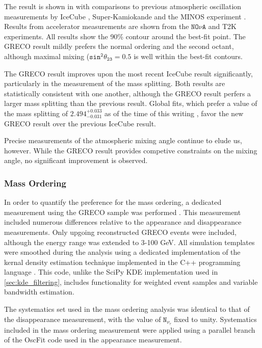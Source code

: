 The result is shown in  with comparisons to previous atmospheric oscillation measurements by IceCube , Super-Kamiokande  and the MINOS experiment .
Results from accelerator measurements are shown from the $\mathtt{NO\nu A}$  and T2K  experiments.
All results show the 90\% contour around the best-fit point.
The GRECO result mildly prefers the normal ordering and the second octant, although maximal mixing ($\mathtt{sin^2\theta_{23}=0.5}$ is well within the best-fit contours.

The GRECO result improves upon the most recent IceCube result significantly, particularly in the measurement of the mass splitting.
Both results are statistically consistent with one another, although the GRECO result perfers a larger mass splitting than the previous result.
Global fits, which prefer a value of the mass splitting of $\mathtt{2.494^{+0.033}_{-0.031}}$ as of the time of this writing , favor the new GRECO result over the previous IceCube result.

Precise measurements of the atmospheric mixing angle continue to elude us, however.
While the GRECO result provides competive constraints on the mixing angle, no significant improvement is observed.

\label{subsubsec:nmo_results}
\subsubsection{Mass Ordering}
In order to quantify the preference for the mass ordering, a dedicated measurement using the GRECO sample was performed .
This measurement included numerous differences relative to the appearance and disappearance measurements.
Only upgoing reconstructed GRECO events were included, although the energy range was extended to 3-100 GeV.
All simulation templates were smoothed during the analysis using a dedicated implementation of the kernal density estimation technique implemented in the C++ programming language .
This code, unlike the SciPy KDE implementation used in \ref{sec:kde_filtering}, includes functionality for weighted event samples and variable bandwidth estimation.

The systematics set used in the mass ordering analysis was identical to that of the disappearance measurement, with the value of $\mathtt{N_{\nu_\tau}}$ fixed to unity.
Systematics included in the mass ordering measurement were applied using a parallel branch of the OscFit code used in the appearance measurement.


